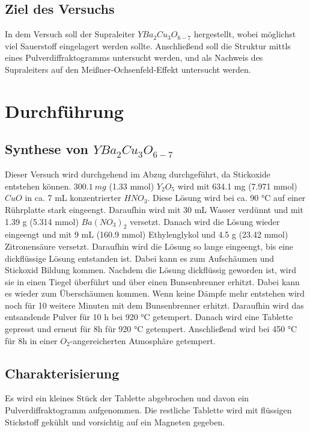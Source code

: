 \documentclass[12pt, a4paper]{article}
\begin{document}
\subsection{Ziel des Versuchs}
{In dem Versuch soll der Supraleiter $YBa_2Cu_3O_{6-7}$ hergestellt, wobei möglichst viel Sauerstoff eingelagert werden sollte. Anschließend soll die Struktur mittls eines Pulverdiffraktogramms untersucht werden, 
und als Nachweis des Supraleiters auf den Meißner-Ochsenfeld-Effekt untersucht werden.\cite{Skript}
}

\newpage
\section{Durchführung}
\subsection{\texorpdfstring{Synthese von $YBa_2Cu_3O_{6-7}$}{Synthese von YBa2Cu3O6-7}}
{

Dieser Versuch wird durchgehend im Abzug durchgeführt, da Stickoxide entstehen können.
$300.1\ mg$ (1.33 mmol) $Y_2O_5$ wird mit 634.1 mg (7.971 mmol) $CuO$ in ca. 7 mL konzentrierter $HNO_3$. Diese Lösung wird bei ca. 90 °C auf einer 
Rührplatte stark eingeengt. Daraufhin wird mit 30 mL Wasser verdünnt und mit 1.39 g (5.314 mmol) $Ba(NO_3)_2$ versetzt. Danach wird die Lösung wieder eingeengt und mit 
9 mL (160.9 mmol) Ethylenglykol und 4.5 g (23.42 mmol) Zitronensäure versetzt. Daraufhin wird die Lösung so lange eingeengt, bis eine dickflüssige Lösung entstanden ist. 
Dabei kann es zum Aufschäumen und Stickoxid Bildung kommen. Nachdem die Lösung dickflüssig geworden ist, wird sie in einen Tiegel überführt und über einen Bunsenbrenner erhitzt. 
Dabei kann es wieder zum Überschäumen kommen. Wenn keine Dämpfe mehr entstehen wird noch für 10 weitere Minuten mit dem Bunsenbrenner erhitzt. Daraufhin wird das entsandende Pulver für 10 h bei 920 °C getempert. 
Danach wird eine Tablette gepresst und erneut für 8h für 920 °C getempert. Anschließend wird bei 450 °C für 8h in einer $O_2$-angereicherten Atmosphäre getempert.\cite{Skript}
}
\subsection{Charakterisierung}
{
Es wird ein kleines Stück der Tablette abgebrochen und davon ein Pulverdiffraktogramm aufgenommen. Die restliche Tablette wird mit flüssigen Stickstoff gekühlt und vorsichtig auf 
ein Magneten gegeben. 
}
\end{document}
